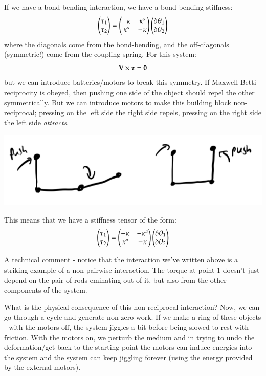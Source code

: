 If we have a bond-bending interaction, we have a bond-bending stiffness:
\begin{equation}
    \begin{pmatrix}\tau_1 \\ \tau_2\end{pmatrix} = \begin{pmatrix}-\kappa & \kappa^s \\ \kappa^s & -\kappa\end{pmatrix}\begin{pmatrix}\delta\theta_1 \\ \delta\theta_2\end{pmatrix}
\end{equation}
where the diagonals come from the bond-bending, and the off-diagonals (symmetric!) come from the coupling spring. For this system:
\begin{equation}
    \nabla \times \gv{\tau} = \v{0}
\end{equation}
but we can introduce batteries/motors to break this symmetry. If Maxwell-Betti reciprocity is obeyed, then pushing one side of the object should repel the other symmetrically. But we can introduce motors to make this building block non-reciprocal; pressing on the left side the right side repels, pressing on the right side the left side \emph{attracts}.
\begin{center}
    \includegraphics[scale=0.35]{Lectures/Images/lec3-nonreciprocalgadget.png}
\end{center}
This means that we have a stiffness tensor of the form:
\begin{equation}\label{eq:microscopic}
    \begin{pmatrix}\tau_1 \\ \tau_2\end{pmatrix} = \begin{pmatrix}-\kappa & -\kappa^a \\ \kappa^a & -\kappa\end{pmatrix}\begin{pmatrix}\delta\theta_1 \\ \delta\theta_2\end{pmatrix}
\end{equation}

A technical comment - notice that the interaction we've written above is a striking example of a non-pairwise interaction. The torque at point 1 doesn't just depend on the pair of rods eminating out of it, but also from the other components of the system.

What is the physical consequence of this non-reciprocal interaction? Now, we can go through a cycle and generate non-zero work. If we make a ring of these objects - with the motors off, the system jiggles a bit before being slowed to rest with friction. With the motors on, we perturb the medium and in trying to undo the deformation/get back to the starting point the motors can induce energies into the system and the system can keep jiggling forever (using the energy provided by the external motors).

